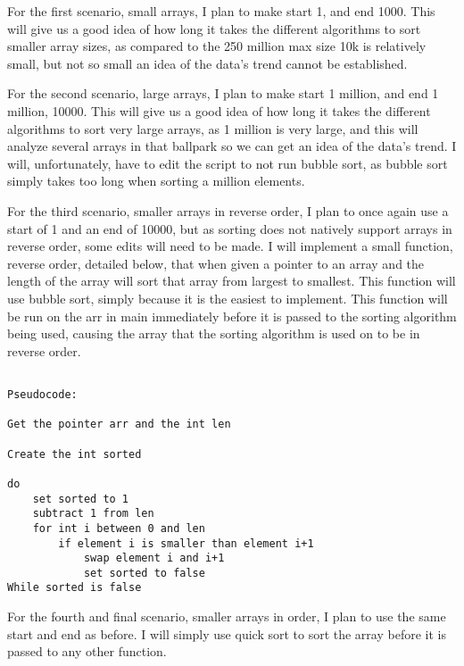 \documentclass[11pt]{article}
\begin{document}
For the first scenario, small arrays, I plan to make start 1, and end 1000. This will give us a good idea of how long it takes the different algorithms to sort smaller array sizes, as compared to the 250 million max size 10k is relatively small, but not so small an idea of the data's trend cannot be established.

For the second scenario, large arrays, I plan to make start 1 million, and end 1 million, 10000. This will give us a good idea of how long it takes the different algorithms to sort very large arrays, as 1 million is very large, and this will analyze several arrays in that ballpark so we can get an idea of the data's trend. I will, unfortunately, have to edit the script to not run bubble sort, as bubble sort simply takes too long when sorting a million elements.

For the third scenario, smaller arrays in reverse order, I plan to once again use a start of 1 and an end of 10000, but as sorting does not natively support arrays in reverse order, some edits will need to be made. I will implement a small function, reverse order, detailed below, that when given a pointer to an array and the length of the array will sort that array from largest to smallest. This function will use bubble sort, simply because it is the easiest to implement. This function will be run on the arr in main immediately before it is passed to the sorting algorithm being used, causing the array that the sorting algorithm is used on to be in reverse order.

\begin{verbatim}

Pseudocode:

Get the pointer arr and the int len

Create the int sorted

do
    set sorted to 1
    subtract 1 from len
    for int i between 0 and len
        if element i is smaller than element i+1
            swap element i and i+1
            set sorted to false
While sorted is false

\end{verbatim}

For the fourth and final scenario, smaller arrays in order, I plan to use the same start and end as before. I will simply use quick sort to sort the array before it is passed to any other function.
\end{document}
